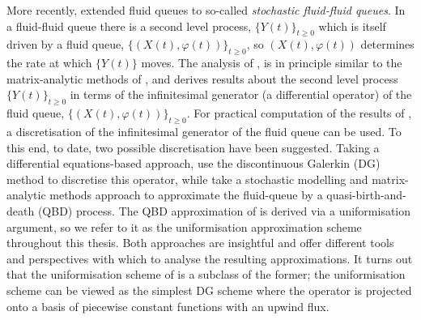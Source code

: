 More recently, \cite{bo2014} extended fluid queues to so-called \emph{stochastic fluid-fluid queues}. In a fluid-fluid queue there is a second level process, \(\{Y(t)\}_{t\geq0}\) which is itself driven by a fluid queue, \(\{(X(t),\varphi(t))\}_{t\geq0}\), so \((X(t),\varphi(t))\) determines the rate at which \(\{Y(t)\}\) moves. The analysis of \cite{bo2014}, is in principle similar to the matrix-analytic methods of \cite{bean2005}, and derives results about the second level process \(\{Y(t)\}_{t\geq0}\) in terms of the infinitesimal generator (a differential operator) of the fluid queue, \(\{(X(t),\varphi(t))\}_{t\geq0}\). For practical computation of the results of \cite{bo2014}, a discretisation of the infinitesimal generator of the fluid queue can be used. To this end, to date, two possible discretisation have been suggested. Taking a differential equations-based approach, \cite{blnos2022} use the discontinuous Galerkin (DG) method to discretise this operator, while \cite{bo2013} take a stochastic modelling and matrix-analytic methods approach to approximate the fluid-queue by a quasi-birth-and-death (QBD) process. The QBD approximation of \cite{bo2013} is derived via a uniformisation argument, so we refer to it as the uniformisation approximation scheme throughout this thesis. Both approaches are insightful and offer different tools and perspectives with which to analyse the resulting approximations. It turns out that the uniformisation scheme of \cite{bo2013} is a subclass of the former; the uniformisation scheme can be viewed as the simplest DG scheme where the operator is projected onto a basis of piecewise constant functions with an upwind flux.


